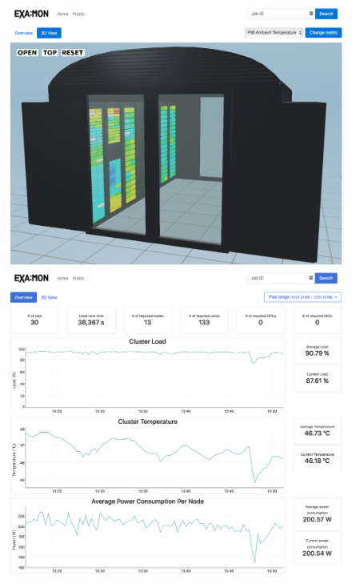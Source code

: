 \documentclass[a4paper, twoside]{article}
\begin{document}
\begin{multicols}{3}
\begin{figure}[t!]
    \includegraphics[width=2\columnwidth+\columnsep]{public-3d}
    \hspace{\columnsep}
    \begin{minipage}[b]{\columnwidth}
        \includegraphics[width=\linewidth]{public-overview}

\end{minipage}
\end{figure}
\end{multicols}
\end{document}
